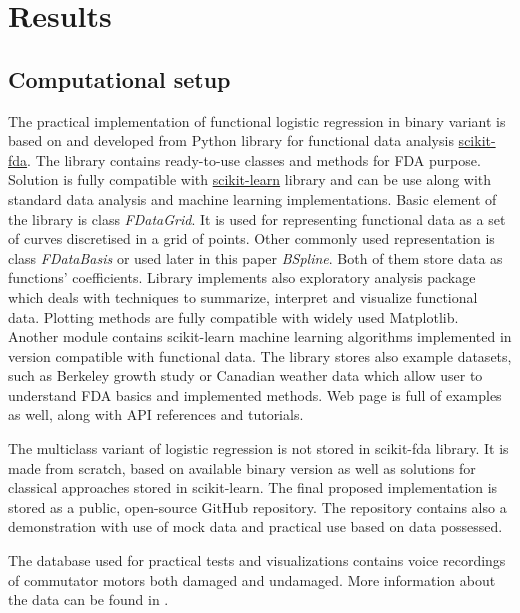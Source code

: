 \documentclass[energies,article,submit,pdftex,moreauthors]{Definitions/mdpi}
\begin{document}
\section{Results}

\subsection{Computational setup}

The practical implementation of functional logistic regression in binary variant is based on and developed from Python library for functional data analysis \href{https://fda.readthedocs.io/en/latest/index.html}{scikit-fda}. The library contains ready-to-use classes and methods for FDA purpose. Solution is fully compatible with \href{https://scikit-learn.org/}{scikit-learn} library and can be use along with standard data analysis and machine learning implementations. Basic element of the library is class \textit{FDataGrid}. It is used for representing functional data as a set of curves discretised in a grid of points. Other commonly used representation is class \textit{FDataBasis} or used later in this paper \textit{BSpline}. Both of them store data as functions' coefficients. Library implements also exploratory analysis package which deals with techniques to summarize, interpret and visualize functional data. Plotting methods are fully compatible with widely used Matplotlib. Another module contains scikit-learn machine learning algorithms implemented in version compatible with functional data. The library stores also example datasets, such as Berkeley growth study or Canadian weather data which allow user to understand FDA basics and implemented methods. Web page is full of examples as well, along with API references and tutorials.

The multiclass variant of logistic regression is not stored in scikit-fda library. It is made from scratch, based on available binary version as well as solutions for classical approaches stored in scikit-learn. The final proposed implementation is stored as a public, open-source GitHub repository. The repository contains also a demonstration with use of mock data and practical use based on data possessed.

The database used for practical tests and visualizations contains voice recordings of commutator motors both damaged and undamaged. More information about the data can be found in \cite{ref-motors}.

\end{document}
